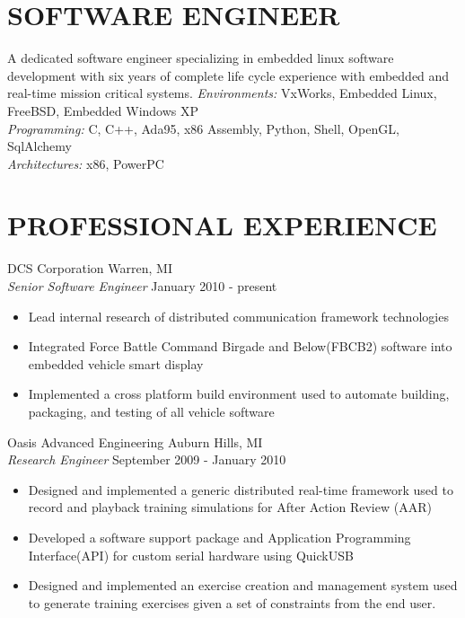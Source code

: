 \documentclass[line]{res}
\begin{document}
\address{Relocating to San Francisco, CA in December 2011}
\address{mathew.prokos@gmail.com}

\begin{resume}
\section{SOFTWARE ENGINEER}
    A dedicated software engineer specializing in embedded linux software
    development with six years of complete life cycle experience with embedded and
    real-time mission critical systems.  
    {\sl Environments:} VxWorks, Embedded Linux, FreeBSD, Embedded Windows XP\\
    {\sl Programming:} C, C++, Ada95, x86 Assembly, Python, Shell, OpenGL,
    SqlAlchemy\\
    {\sl Architectures:} x86, PowerPC

\section{PROFESSIONAL EXPERIENCE}
    \vspace{1mm}
    DCS Corporation \hfill Warren, MI\\
    {\sl Senior Software Engineer} \hfill January 2010 - present
    \vspace{1mm}
    \begin{itemize} 
       \item Lead internal research of distributed communication framework
       technologies  
       \item Integrated Force Battle Command Birgade and Below(FBCB2) software into
       embedded vehicle smart display
       \item Implemented a cross platform build environment used to automate
       building, packaging, and testing of all vehicle software 
    \end{itemize}

    \vspace{-2mm}
    Oasis Advanced Engineering \hfill Auburn Hills, MI\\
    {\sl Research Engineer} \hfill September 2009 - January 2010
    \vspace{1mm}
    \begin{itemize} 
       \item Designed and implemented a generic distributed real-time framework
      used to record and playback training simulations for After Action Review (AAR)
       \item Developed a software support package and Application Programming
       Interface(API) for custom serial hardware using QuickUSB   
       \item Designed and implemented an exercise creation and management system used
       to generate training exercises given a set of constraints from the end user. 
    \end{itemize}


\end{resume}
\end{document}
